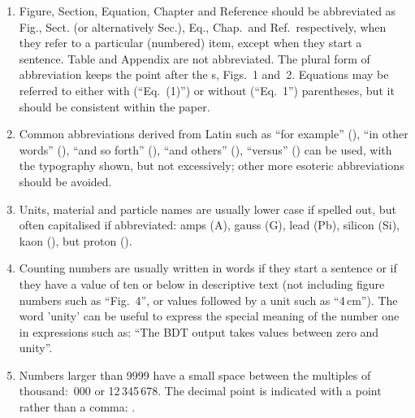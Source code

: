 \begin{enumerate}
\item Figure, Section, Equation, Chapter and Reference should be
  abbreviated as Fig., Sect. (or alternatively Sec.), Eq., Chap.\ and
  Ref.\ respectively, when they refer to a particular (numbered) item,
  except when they start a sentence. Table and Appendix are not
  abbreviated.  The plural form of abbreviation keeps the point after
  the s, \eg Figs.~1 and~2. Equations may be referred to either with 
  (``Eq.~(1)'') or without (``Eq.~1'') parentheses, 
  but it should be consistent within the paper.

\item Common abbreviations derived from Latin such as ``for example''
  (\eg), ``in other words'' (\ie), ``and so forth'' (\etc), ``and
  others'' (\etal), ``versus'' (\vs) can be used, with the typography
  shown, but not excessively; other more esoteric abbreviations should be avoided.
  

\item Units, material and particle names are usually lower case if
  spelled out, but often capitalised if abbreviated: amps (A), gauss
  (G), lead (Pb), silicon (Si), kaon (\kaon), but proton (\proton).


\item Counting numbers are usually written in words if they start a
  sentence or if they have a value of ten or below in descriptive
  text (\ie not including figure numbers such as ``Fig.\ 4'', or
  values followed by a unit such as ``4\,cm'').
  The word 'unity' can be useful to express the special meaning of
  the number one in expressions such as: 
``The BDT output takes values between zero and unity''.

\item Numbers larger than 9999 have a small space between
  the multiples of thousand: \,000 or 12\,345\,678.  The decimal
  point is indicated with a point rather than a comma: .


\end{enumerate}
